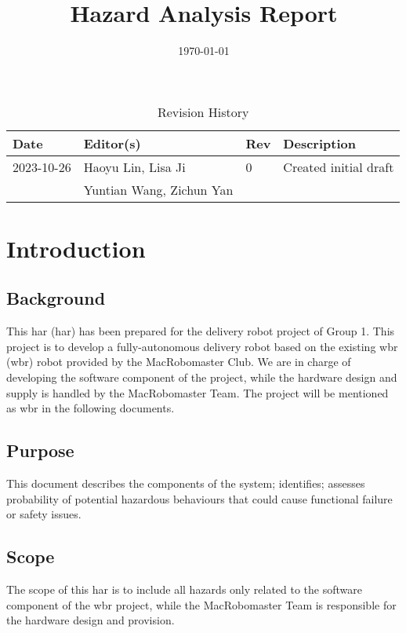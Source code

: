 \documentclass{article}
\title{Hazard Analysis Report\\\progname}
\author{\authname}
\date{\today}
\begin{document}
\maketitle

\newpage

\begin{table}[hp]
\caption{Revision History} \label{TblRevisionHistory}
\begin{tabularx}{\textwidth}{lllX}
\toprule
\textbf{Date} & \textbf{Editor(s)} & \textbf{Rev} & \textbf{Description}\\
\midrule
2023-10-26 & Haoyu Lin, Lisa Ji & 0 & Created initial draft\\
& Yuntian Wang, Zichun Yan &&\\
\bottomrule
\end{tabularx}
\end{table}

\newpage
\tableofcontents
\listoffigures
\listoftables
\newpage

\section{Introduction}
\subsection{Background}
This \glsdesc{har} (\gls{har}) has been prepared for the delivery robot project of Group 1. This project is to develop a fully-autonomous delivery robot based on the existing \glsdesc{wbr} (\gls{wbr}) robot provided by the MacRobomaster Club. We are in charge of developing the software component of the project, while the hardware design and supply is handled by the MacRobomaster Team. The project will be mentioned as \gls{wbr} in the following documents.
\subsection{Purpose}
This document describes the components of the system; identifies; assesses probability of potential hazardous behaviours that could cause functional failure or safety issues.
\subsection{Scope}
The scope of this \gls{har} is to include all hazards only related to the software component of the \gls{wbr} project, while the MacRobomaster Team is responsible for the hardware design and provision. 
\end{document}
